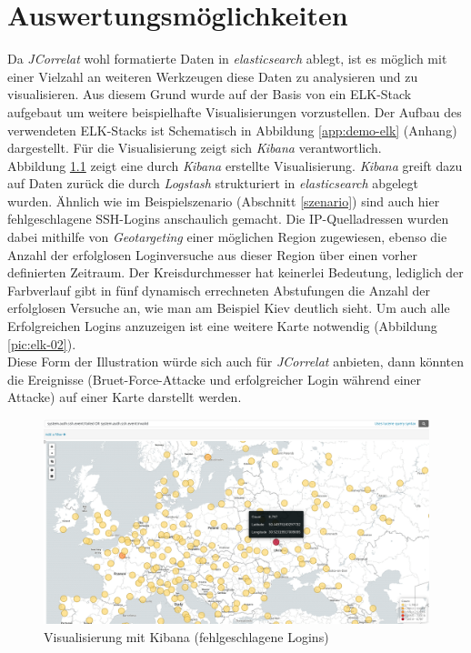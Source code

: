 \chapter{Auswertungsmöglichkeiten}\label{ausblick}
\thispagestyle{fancy}

Da \textit{JCorrelat} wohl formatierte Daten in \textit{elasticsearch} ablegt, ist es 
möglich mit einer Vielzahl an weiteren Werkzeugen diese Daten zu analysieren und zu 
visualisieren. Aus diesem Grund wurde auf der Basis von \cite{kleindienst} ein 
ELK-Stack aufgebaut um weitere beispielhafte Visualisierungen vorzustellen. Der 
Aufbau des verwendeten ELK-Stacks ist Schematisch in Abbildung \ref{app:demo-elk} (Anhang)
dargestellt. Für die Visualisierung zeigt sich \textit{Kibana} verantwortlich.\\
Abbildung \ref{pic:elk-01} zeigt eine durch \textit{Kibana} erstellte Visualisierung. 
\textit{Kibana} greift dazu auf Daten zurück die durch \textit{Logstash} strukturiert in 
\textit{elasticsearch} abgelegt wurden.
Ähnlich wie im Beispielszenario (Abschnitt \ref{szenario}) sind auch hier fehlgeschlagene 
SSH-Logins anschaulich gemacht. Die IP-Quelladressen wurden dabei mithilfe von 
\textit{Geotargeting} einer möglichen Region zugewiesen, ebenso die Anzahl der 
erfolglosen Loginversuche aus dieser Region über einen vorher definierten Zeitraum. Der 
Kreisdurchmesser hat keinerlei Bedeutung, lediglich der Farbverlauf gibt in fünf 
dynamisch errechneten Abstufungen die Anzahl der erfolglosen Versuche an, wie man am 
Beispiel Kiev deutlich sieht. Um auch alle Erfolgreichen Logins anzuzeigen ist eine 
weitere Karte notwendig (Abbildung \ref{pic:elk-02}).\\
Diese Form der Illustration würde sich auch für \textit{JCorrelat} anbieten, dann 
könnten die Ereignisse (Bruet-Force-Attacke und erfolgreicher Login während einer Attacke)
auf einer Karte darstellt werden.

\begin{figure}[htbp]
    \caption{Visualisierung mit Kibana (fehlgeschlagene Logins)}
    \label{pic:elk-01}\vspace{0.2cm}
    \centering
    \includegraphics[scale=0.28]{img/elk-01}  
\end{figure}


